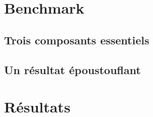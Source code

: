 \documentclass[architecture]{compas2018}
\begin{document}
\section{Benchmark}

\subsection{Trois composants essentiels}

\subsection{Un résultat époustouflant}

\section{Résultats}
\end{document}
